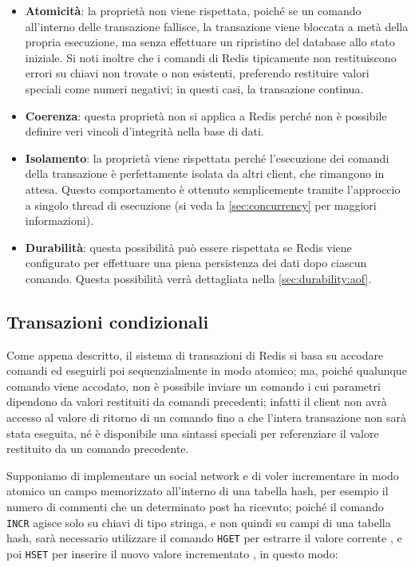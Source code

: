 \begin{itemize}
	\item \textbf{Atomicità}: la proprietà non viene rispettata, poiché se un comando all'interno
	delle transazione fallisce, la transazione viene bloccata a metà della propria esecuzione,
	ma senza effettuare un ripristino del database allo stato iniziale. Si noti inoltre che i
	comandi di Redis tipicamente non restituiscono errori su chiavi non trovate o non esistenti, 
	preferendo restituire valori speciali come numeri negativi; in questi casi, la transazione
	continua. 

	\item \textbf{Coerenza}: questa proprietà non si applica a Redis perché non è possibile definire 
	veri vincoli d'integrità nella base di dati.

	\item \textbf{Isolamento}: la proprietà viene rispettata perché l'esecuzione dei comandi
	della transazione è perfettamente isolata da altri client, che rimangono in attesa. Questo
	comportamento è ottenuto semplicemente tramite l'approccio a singolo thread di esecuzione (si
	veda la \autoref{sec:concurrency} per maggiori informazioni).

	\item \textbf{Durabilità}: questa possibilità può essere rispettata se Redis viene configurato
	per effettuare una piena persistenza dei dati dopo ciascun comando. Questa possibilità
	verrà dettagliata nella	\autoref{sec:durability:aof}.
\end{itemize}


\subsection{Transazioni condizionali}

Come appena descritto, il sistema di transazioni di Redis si basa su accodare comandi ed eseguirli
poi sequenzialmente in modo atomico; ma, poiché qualunque comando viene accodato, non è possibile
inviare un comando i cui parametri dipendono da valori restituiti da comandi precedenti; infatti il
client non avrà accesso al valore di ritorno di un comando fino a che l'intera transazione non sarà
stata eseguita, né è disponibile una sintassi speciali per referenziare il valore restituito da un
comando precedente.

Supponiamo di implementare un social network e di voler incrementare in modo atomico un campo
memorizzato all'interno di una tabella hash, per esempio il numero di commenti che un determinato
post ha ricevuto; poiché il comando \verb|INCR| agisce solo su chiavi di tipo stringa, e non quindi
su campi di una tabella hash, sarà necessario utilizzare il comando \verb|HGET| per estrarre il
valore corrente , e poi \verb|HSET| per inserire il nuovo valore incrementato , in
questo modo:

